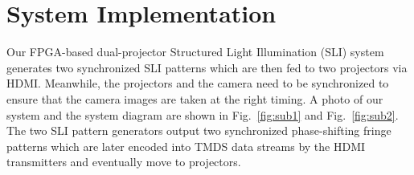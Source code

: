 \documentclass[]{spie}  %
\begin{document}
\section{System Implementation}
Our FPGA-based dual-projector Structured Light Illumination (SLI) system generates two synchronized SLI patterns which are then fed to two projectors via HDMI. Meanwhile, the projectors and the camera need to be synchronized to ensure that the camera images are taken at the right timing. A photo of our system and the system diagram are shown in Fig.~\ref{fig:sub1} and Fig.~\ref{fig:sub2}. The two SLI pattern generators output two synchronized phase-shifting fringe patterns which are later encoded into TMDS data streams by the HDMI transmitters and eventually move to projectors. 

\end{document}
